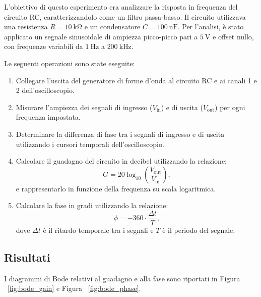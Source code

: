 \documentclass[a4paper,10pt]{article}
\begin{document}
\begin{multicols}{2}
L'obiettivo di questo esperimento era analizzare la risposta in frequenza del circuito RC, caratterizzandolo come un filtro passa-basso. Il circuito utilizzava una resistenza \( R = \SI{10}{\kilo\ohm} \) e un condensatore \( C = \SI{100}{\nano\farad} \). Per l'analisi, è stato applicato un segnale sinusoidale di ampiezza picco-picco pari a \(\SI{5}{\volt}\) e offset nullo, con frequenze variabili da \(\SI{1}{\hertz}\) a \(\SI{200}{\kilo\hertz}\). 

Le seguenti operazioni sono state eseguite:
\begin{enumerate}
    \item Collegare l'uscita del generatore di forme d’onda al circuito RC e ai canali 1 e 2 dell'oscilloscopio.
    \item Misurare l'ampiezza dei segnali di ingresso (\(V_{\text{in}}\)) e di uscita (\(V_{\text{out}}\)) per ogni frequenza impostata.
    \item Determinare la differenza di fase tra i segnali di ingresso e di uscita utilizzando i cursori temporali dell’oscilloscopio.
    \item Calcolare il guadagno del circuito in decibel utilizzando la relazione:
    \[
    G = 20 \log_{10} \left( \frac{V_{\text{out}}}{V_{\text{in}}} \right),
    \]
    e rappresentarlo in funzione della frequenza su scala logaritmica.
    \item Calcolare la fase in gradi utilizzando la relazione:
    \[
    \phi = -360 \cdot \frac{\Delta t}{T},
    \]
    dove \(\Delta t\) è il ritardo temporale tra i segnali e \(T\) è il periodo del segnale.
\end{enumerate}
\end{multicols}

\subsection{Risultati}
I diagrammi di Bode relativi al guadagno e alla fase sono riportati in Figura ~\ref{fig:bode_gain} e Figura ~\ref{fig:bode_phase}.
\end{document}
